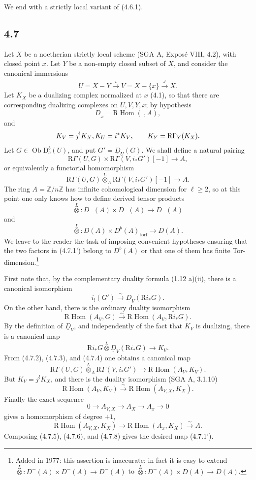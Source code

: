 \documentclass[12pt]{article}
\newcommand{\ZZ}{\mathbb Z}
\newcommand{\Hom}{\operatorname{Hom}}
\newcommand{\ob}{\operatorname{Ob}}
\newcommand{\D}{\mathrm D}
\newcommand{\R}{\mathrm R}
\begin{document}
We end with a strictly local variant of (4.6.1).

\subsection*{4.7}
Let $X$ be a noetherian strictly local scheme (SGA A, Exposé VIII, 4.2), with closed point $x$. Let $Y$ be a non-empty closed subset of $X$, and consider the canonical immersions
\[
   U=X-Y\xrightarrow{i}V=X-\{x\}\xrightarrow{j}X.
\]
Let $K_X$ be a dualizing complex normalized at $x$ (4.1), so that there are corresponding dualizing complexes on $U,V,Y,x$; by hypothesis
\[
   \underline D_x=\R\Hom(\ ,A),
\]
and
\[
   K_V=j^!K_X,\\ K_U=i^*K_V,
   \qquad K_Y=\R\Gamma_Y(K_X).
\]
Let $G\in\ob\D_c^b(U)$, and put $G'=\underline D_U(G)$. We shall define a natural pairing
\[
   \R\Gamma(U,G)\times\R\Gamma(V,i_*G')[-1]
       \longrightarrow A,\tag{4.7.1}
\]
or equivalently a functorial homomorphism
\[
   \R\Gamma(U,G)\overset{L}{\otimes}_A
   \R\Gamma(V,i_*G')[-1]\longrightarrow A.\tag{4.7.1'}
\]
The ring $A=\ZZ/n\ZZ$ has infinite cohomological dimension for $\ell\ge2$, so at this point one only knows how to define derived tensor products
\[
   \overset L\otimes:D^-(A)\times D^-(A)\to D^-(A)
\]
and
\[
   \overset L\otimes:D(A)\times D^b(A)_{\mathrm{torf}}\to D(A).
\]
We leave to the reader the task of imposing convenient hypotheses ensuring that the two factors in (4.7.1') belong to $D^b(A)$ or that one of them has finite Tor-dimension.\footnote{Added in 1977: this assertion is inaccurate; in fact it is easy to extend $\overset L\otimes:D^-(A)\times D^-(A)\to D^-(A)$ to $\overset L\otimes:D^-(A)\times D(A)\to D(A)$.}

First note that, by the complementary duality formula (1.12 a)(ii), there is a canonical isomorphism
\[
   i_!(G')\xrightarrow{\sim}\underline D_V(\R i_*G).\tag{4.7.2}
\]
On the other hand, there is the ordinary duality isomorphism
\[
   \R\Hom(A_V,G)\xrightarrow{\sim}\R\Hom(A_V,\R i_*G).\tag{4.7.3}
\]
By the definition of $\underline D_V$, and independently of the fact that $K_V$ is dualizing, there is a canonical map
\[
   \R i_*G\overset L\otimes \underline D_V(\R i_*G)
      \longrightarrow K_V.\tag{4.7.4}
\]
From (4.7.2), (4.7.3), and (4.7.4) one obtains a canonical map
\[
   \R\Gamma(U,G)\overset L\otimes_A \R\Gamma(V,i_*G')
      \longrightarrow \R\Hom(A_V,K_V).\tag{4.7.5}
\]
But $K_V=j^!K_X$, and there is the duality isomorphism (SGA A, 3.1.10)
\[
   \R\Hom(A_V,K_V)\xrightarrow{\sim}\R\Hom(A_{V,X},K_X).\tag{4.7.6}
\]
Finally the exact sequence
\[
   0\longrightarrow A_{V,X}\longrightarrow A_X\longrightarrow A_x\longrightarrow0\tag{4.7.7}
\]
gives a homomorphism of degree $+1$,
\[
   \R\Hom(A_{V,X},K_X)\longrightarrow
   \R\Hom(A_x,K_X)\xrightarrow{\sim}A.\tag{4.7.8}
\]
Composing (4.7.5), (4.7.6), and (4.7.8) gives the desired map (4.7.1').
\end{document}
